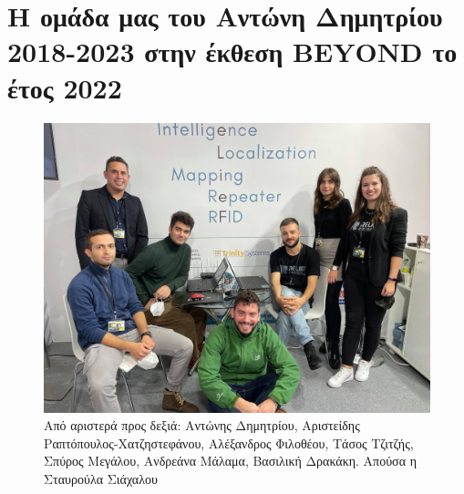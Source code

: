 \section{Η ομάδα μας του Αντώνη Δημητρίου 2018-2023 στην έκθεση BEYOND το έτος 2022}
\begin{figure}[H]\centering
  \includegraphics[scale=0.25]{./figures/parts/appendix/chapters/06/beyond_1.jpg}
  \caption{\small Από αριστερά προς δεξιά: Αντώνης Δημητρίου, Αριστείδης
           Ραπτόπουλος-Χατζηστεφάνου, Αλέξανδρος Φιλοθέου, Τάσος Τζιτζής,
           Σπύρος Μεγάλου, Ανδρεάνα Μάλαμα, Βασιλική Δρακάκη. Απούσα η
           Σταυρούλα Σιάχαλου}
\end{figure}
